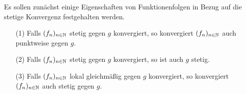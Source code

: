 Es sollen zunächst einige Eigenschaften von Funktionenfolgen in Bezug auf die stetige Konvergenz festgehalten werden.

\begin{prop}
  \label{prop:stetigkonv}
  \begin{itemize}
    \item[(1)] Falls $(f_n)_{n \in \mathbb{N}}$ stetig gegen $g$ konvergiert, so konvergiert $(f_n)_{n \in \mathbb{N}}$ auch punktweise gegen $g$.
    \item[(2)] Falls $(f_n)_{n \in \mathbb{N}}$ stetig gegen $g$ konvergiert, so ist auch $g$ stetig.
    \item[(3)] Falls $(f_n)_{n \in \mathbb{N}}$ lokal gleichmäßig gegen $g$ konvergiert, so konvergiert $(f_n)_{n \in \mathbb{N}}$ auch stetig gegen $g$.
  \end{itemize}
\end{prop}

